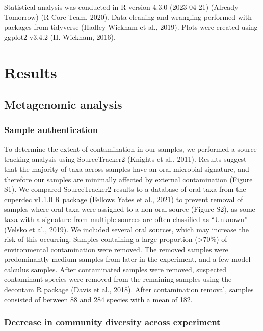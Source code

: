 \documentclass[
]{article}
\begin{document}
Statistical analysis was conducted in R version 4.3.0 (2023-04-21)
(Already Tomorrow) (R Core Team, 2020). Data cleaning and wrangling
performed with packages from tidyverse (Hadley Wickham et al., 2019).
Plots were created using ggplot2 v3.4.2 (H. Wickham, 2016).

\hypertarget{results}{%
\section{Results}\label{results}}

\hypertarget{metagenomic-analysis}{%
\subsection{Metagenomic analysis}\label{metagenomic-analysis}}

\hypertarget{sample-authentication}{%
\subsubsection{Sample authentication}\label{sample-authentication}}

To determine the extent of contamination in our samples, we performed a
source-tracking analysis using SourceTracker2 (Knights et al., 2011).
Results suggest that the majority of taxa across samples have an oral
microbial signature, and therefore our samples are minimally affected by
external contamination (Figure S1). We compared SourceTracker2 results
to a database of oral taxa from the cuperdec v1.1.0 R package (Fellows
Yates et al., 2021) to prevent removal of samples where oral taxa were
assigned to a non-oral source (Figure S2), as some taxa with a signature
from multiple sources are often classified as ``Unknown'' (Velsko et
al., 2019). We included several oral sources, which may increase the
risk of this occurring. Samples containing a large proportion
(\textgreater70\%) of environmental contamination were removed. The
removed samples were predominantly medium samples from later in the
experiment, and a few model calculus samples. After contaminated samples
were removed, suspected contaminant-species were removed from the
remaining samples using the decontam R package (Davis et al., 2018).
After contamination removal, samples consisted of between 88 and 284
species with a mean of 182.

\hypertarget{decrease-in-community-diversity-across-experiment}{%
\subsubsection{Decrease in community diversity across
experiment}\label{decrease-in-community-diversity-across-experiment}}
\end{document}
